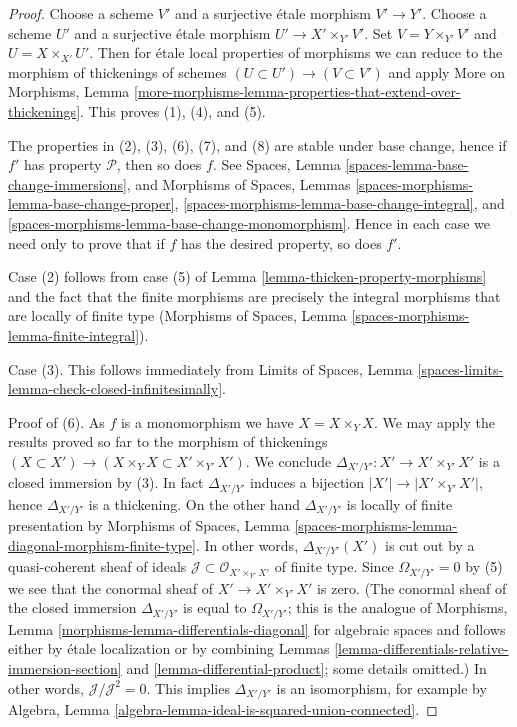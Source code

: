 \begin{proof}
Choose a scheme $V'$ and a surjective \'etale morphism $V' \to Y'$.
Choose a scheme $U'$ and a surjective \'etale morphism
$U' \to X' \times_{Y'} V'$. Set $V = Y \times_{Y'} V'$ and
$U = X \times_{X'} U'$. Then for \'etale local properties of morphisms
we can reduce to the morphism of thickenings of schemes
$(U \subset U') \to (V \subset V')$ and apply
More on Morphisms, Lemma
\ref{more-morphisms-lemma-properties-that-extend-over-thickenings}.
This proves (1), (4), and (5).

\medskip\noindent
The properties in (2), (3), (6), (7), and (8) are stable
under base change, hence if $f'$ has property $\mathcal{P}$, then so
does $f$. See Spaces, Lemma \ref{spaces-lemma-base-change-immersions},
and
Morphisms of Spaces, Lemmas
\ref{spaces-morphisms-lemma-base-change-proper},
\ref{spaces-morphisms-lemma-base-change-integral}, and
\ref{spaces-morphisms-lemma-base-change-monomorphism}.
Hence in each case we need only to prove that if $f$ has
the desired property, so does $f'$.

\medskip\noindent
Case (2) follows from case (5) of Lemma \ref{lemma-thicken-property-morphisms}
and the fact that the finite morphisms are precisely
the integral morphisms that are locally of finite type
(Morphisms of Spaces, Lemma \ref{spaces-morphisms-lemma-finite-integral}).

\medskip\noindent
Case (3). This follows immediately from
Limits of Spaces, Lemma
\ref{spaces-limits-lemma-check-closed-infinitesimally}.

\medskip\noindent
Proof of (6). As $f$ is a monomorphism we have $X = X \times_Y X$.
We may apply the results proved so far to the morphism of thickenings
$(X \subset X') \to (X \times_Y X \subset X' \times_{Y'} X')$.
We conclude $\Delta_{X'/Y'} : X' \to X' \times_{Y'} X'$
is a closed immersion by (3). In fact $\Delta_{X'/Y'}$ induces a bijection
$|X'| \to |X' \times_{Y'} X'|$, hence $\Delta_{X'/Y'}$ is a thickening.
On the other hand $\Delta_{X'/Y'}$ is locally of finite presentation by
Morphisms of Spaces, Lemma
\ref{spaces-morphisms-lemma-diagonal-morphism-finite-type}.
In other words, $\Delta_{X'/Y'}(X')$ is cut out by
a quasi-coherent sheaf of ideals
$\mathcal{J} \subset \mathcal{O}_{X' \times_{Y'} X'}$ of finite type.
Since $\Omega_{X'/Y'} = 0$ by (5) we see that
the conormal sheaf of $X' \to X' \times_{Y'} X'$ is zero.
(The conormal sheaf of the closed immersion $\Delta_{X'/Y'}$ is equal to
$\Omega_{X'/Y'}$; this is the analogue of
Morphisms, Lemma \ref{morphisms-lemma-differentials-diagonal}
for algebraic spaces and follows either by \'etale localization
or by combining
Lemmas \ref{lemma-differentials-relative-immersion-section} and
\ref{lemma-differential-product}; some details omitted.)
In other words, $\mathcal{J}/\mathcal{J}^2 = 0$.
This implies $\Delta_{X'/Y'}$ is an isomorphism, for example
by Algebra, Lemma \ref{algebra-lemma-ideal-is-squared-union-connected}.


\end{proof}
